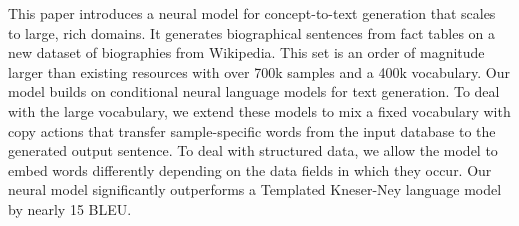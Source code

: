 This paper introduces a neural model for concept-to-text generation that scales to large, rich domains. It generates biographical sentences from fact tables on a new dataset of biographies from Wikipedia. This set is an order of magnitude larger than existing resources with over 700k samples and a 400k vocabulary. Our model builds on conditional neural language models for text generation. To deal with the large vocabulary, we extend these models to mix a fixed vocabulary with copy actions that transfer sample-specific words from the input database to the generated output sentence. To deal with structured data, we allow the model to embed words differently depending on the data fields in which they occur. Our neural model significantly outperforms a Templated Kneser-Ney language model by nearly 15 BLEU.
